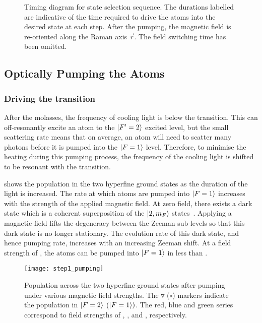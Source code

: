 \begin{figure}[!htbp]
    \centering
    \fontsize{14pt}{14pt}
    \resizebox{0.6\textwidth}{!}{}
    \caption[State selection timing schematic]{Timing diagram for state selection sequence. The durations labelled are indicative of the time required to drive the atoms into the desired state at each step. After the  pumping, the magnetic field is re-oriented along the Raman axis \(\vec{r}\). The  field switching time has been omitted.}
    \label{fig:state_selection_timing}
\end{figure}
\subsection{Optically Pumping the Atoms}\label{subsec:optical_pumping}
\subsubsection{Driving the  transition}
After the molasses, the frequency of cooling light is
 below the  transition. This can
off-resonantly excite an atom to the \(\ket{F'=2}\) excited level, but
the small scattering rate means that on average, an atom will need to
scatter many photons before it is pumped into the \(\ket{F=1}\) level.
Therefore, to minimise the heating during this pumping process, the
frequency of the cooling light is shifted to be resonant with the 
transition.
\par\noindent
{} shows the population in the two
hyperfine ground states as the duration of the  light is
increased. The rate at which atoms are pumped into \(\ket{F=1}\)
increases with the strength of the applied magnetic field. At zero
field, there exists a dark state which is a coherent superposition of
the \(\ket{2,m_F}\) states~\cite{Berkeland2002}. Applying a magnetic
field lifts the degeneracy between the Zeeman sub-levels so that this
dark state is no longer stationary. The evolution rate of this dark
state, and hence pumping rate, increases with an increasing Zeeman
shift. At a field strength of , the atoms can be
pumped into \(\ket{F=1}\) in less than .
\begin{figure}[!htbp]
    \centering
    \texttt{[image: step1\_pumping]}
    \caption[Ground state distribution during  pumping]{Population across the two hyperfine ground states after  pumping under various magnetic field strengths. The $\smalltriangledown$ ($\circ$) markers indicate the population in $\ket{F=2}$ ($\ket{F=1})$. The red, blue and green series correspond to field strengths of , , and , respectively.}
    \label{fig:step1_pumping}
\end{figure}
